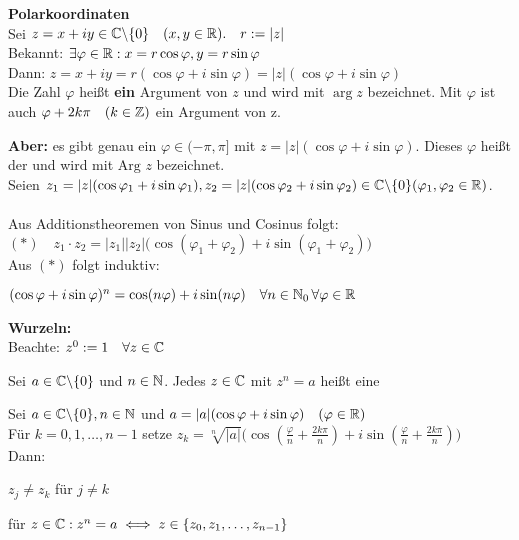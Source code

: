 \documentclass[a4paper,twoside,DIV15,BCOR12mm]{scrbook}
\begin{document}
\textbf{Polarkoordinaten}\\
Sei $z = x + iy \in \mathbb{C} \backslash \{0\} \quad (x,y \in \mathbb{R}). \quad r:=|z|$ \\
Bekannt: $\exists \varphi \in \mathbb{R} : x = r\cos\varphi, y = r\sin\varphi$ \\
Dann: $z = x + iy = r(\cos \varphi + i\sin \varphi) = |z|(\cos\varphi + i\sin\varphi)$ \\
Die Zahl $\varphi$ heißt \textbf{ein} Argument von $z$ und wird mit $\arg z$ bezeichnet. Mit $\varphi$ ist auch $\varphi + 2k\pi \quad (k \in \mathbb{Z})$ ein Argument von z.

\textbf{Aber:} es gibt genau ein $\varphi \in (-\pi, \pi]$ mit $z = |z|(\cos\varphi + i\sin\varphi)$. Dieses $\varphi$ heißt der  und wird mit $\text{Arg } z$ bezeichnet. \\
Seien $z_1 = |z|(\cos\varphi_1 + i\sin\varphi_1), z_2 = |z|(\cos\varphi_2 + i\sin\varphi_2) \in \mathbb{C} \backslash \{0\} (\varphi_1, \varphi_2 \in \mathbb{R})$.\\\\
Aus Additionstheoremen von Sinus und Cosinus folgt: \\
$(*)\quad z_1\cdot z_2 = |z_1||z_2|\big(\cos(\varphi_1+\varphi_2) + i\sin(\varphi_1+\varphi_2)\big)$ \\
Aus $(*)$ folgt induktiv:

\begin{satz}
$(\cos\varphi + i\sin\varphi)^n = \cos(n\varphi) + i\sin(n\varphi) \quad \forall n \in \mathbb{N}_0 \, \forall \varphi \in \mathbb{R}$
\end{satz}

\textbf{Wurzeln:}\\
Beachte: $z^0 := 1 \quad \forall z \in \mathbb{C}$ \\

\begin{definition}
Sei $a \in \mathbb{C} \backslash \{0\}$ und $n \in \mathbb{N}$. Jedes $z \in \mathbb{C}$ mit $z^n = a$ heißt eine 
\end{definition}

\begin{satz}
Sei $a \in \mathbb{C} \backslash \{0\}, n \in \mathbb{N}$ und $a = |a|(\cos\varphi + i\sin\varphi)\quad (\varphi \in \mathbb{R})$ \\
Für $k=0,1,\ldots ,n-1$ setze $z_k = \sqrt[n]{|a|}\big(\cos(\frac{\varphi}{n} + \frac{2k\pi}{n}) + i\sin(\frac{\varphi}{n} + \frac{2k\pi}{n})\big)$ \\
Dann: \begin{liste}
\item $z_j \neq z_k$ für $j \neq k$ \\
\item für $z \in \mathbb{C} : z^n = a \iff z \in \{z_0,z_1,\ldots , z_{n-1}\}$
\end{liste}
\end{satz}
\end{document}
